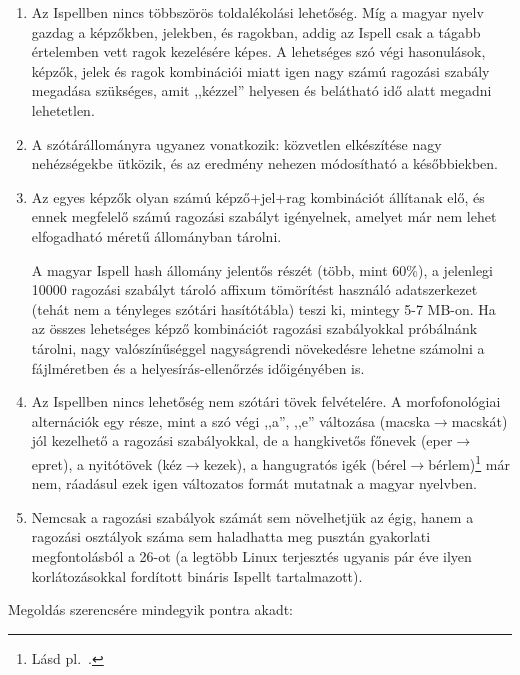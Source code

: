 \begin{enumerate}
\item Az Ispellben nincs többszörös toldalékolási
lehetőség. Míg a magyar nyelv gazdag a képzőkben, jelekben,
és ragokban, addig az Ispell csak a tágabb értelemben
vett ragok kezelésére képes. A lehetséges szó végi hasonulások,
képzők, jelek és ragok
kombinációi miatt igen nagy számú ragozási szabály megadása szükséges,
amit ,,kézzel'' helyesen és belátható idő alatt megadni lehetetlen.

\item A szótárállományra ugyanez vonatkozik: közvetlen
elkészítése nagy nehézségekbe ütközik, és az eredmény nehezen
módosítható a későbbiekben.

\item Az
egyes képzők olyan számú képző+jel+rag kombinációt állítanak elő,
és ennek megfelelő számú ragozási szabályt igényelnek,
amelyet már nem lehet elfogadható méretű állományban tárolni.

A magyar Ispell hash állomány jelentős részét (több, mint 60\%),
a jelenlegi 10000 ragozási szabályt tároló affixum tömörítést
használó adatszerkezet (tehát nem a tényleges szótári hasítótábla)
teszi ki, mintegy 5-7 MB-on. Ha az összes lehetséges képző kombinációt
ragozási szabályokkal próbálnánk tárolni, nagy valószínűséggel
nagyságrendi növekedésre lehetne számolni a fájlméretben
és a helyesírás-ellenőrzés időigényében is.

\item Az Ispellben nincs lehetőség nem szótári tövek
felvételére. A morfofonológiai alternációk egy része, mint a szó végi
,,a'', ,,e'' változása (macska$\rightarrow$macskát) jól kezelhető a
ragozási szabályokkal, de a hangkivetős főnevek
(eper$\rightarrow$epret)\label{hangkiveto}, a nyitótövek
(kéz$\rightarrow$kezek), a hangugratós igék
(bérel$\rightarrow$bérlem)\footnote{Lásd pl.\
\cite[832 skk.]{smny3}.} már nem,
ráadásul ezek igen változatos formát mutatnak a magyar nyelvben.

\item Nemcsak a ragozási szabályok
számát sem növelhetjük az égig, hanem a ragozási osztályok száma
sem haladhatta meg pusztán gyakorlati megfontolásból a 26-ot
(a legtöbb Linux terjesztés ugyanis pár éve ilyen
korlátozásokkal fordított bináris Ispellt tartalmazott).
\end{enumerate}

Megoldás szerencsére mindegyik pontra akadt:

